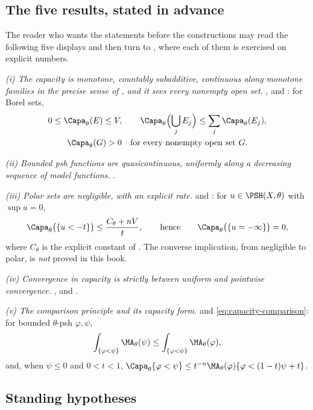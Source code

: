 \subsection{The five results, stated in advance}
\label{sec:ch25-payoff}

The reader who wants the statements before the constructions may read the
following five displays and then turn to , where each
of them is exercised on explicit numbers.

\emph{(i) The capacity is monotone, countably subadditive, continuous along
monotone families in the precise sense of
, and it sees every nonempty open set.}
,
 and :
for Borel sets,
\[
 \begin{gathered}
 0\leq\Capa_\theta(E)\leq V,
 \qquad
 \Capa_\theta\Bigl(\bigcup_j E_j\Bigr)\leq\sum_j\Capa_\theta(E_j),\\
 \Capa_\theta(G)>0\quad\text{for every nonempty open set }G.
 \end{gathered}
\]

\emph{(ii) Bounded psh functions are quasicontinuous, uniformly along a
decreasing sequence of model functions.}
.

\emph{(iii) Polar sets are negligible, with an explicit rate.}
 and
: for $u\in\PSH(X,\theta)$ with
$\sup u=0$,
\[
 \Capa_\theta\bigl(\{u<-t\}\bigr)\leq\frac{C_\theta+nV}{t},
 \qquad\text{hence}\qquad
 \Capa_\theta\bigl(\{u=-\infty\}\bigr)=0 ,
\]
where $C_\theta$ is the explicit constant of
.  The converse implication, from negligible
to polar, is \emph{not} proved in this book.

\emph{(iv) Convergence in capacity is strictly between uniform and pointwise
convergence.}  ,
 and
.

\emph{(v) The comparison principle and its capacity form.}
 and
\eqref{eq:capacity-comparison}: for bounded $\theta$-psh
$\varphi,\psi$,
\[
 \int_{\{\varphi<\psi\}}\MA_\theta(\psi)
 \leq\int_{\{\varphi<\psi\}}\MA_\theta(\varphi),
\]
and, when $\psi\leq0$ and $0<t<1$,
$\Capa_\theta\{\varphi<\psi\}
 \leq t^{-n}\MA_\theta(\varphi)\{\varphi<(1-t)\psi+t\}$.

\subsection{Standing hypotheses}
\label{sec:ch25-hypotheses}

